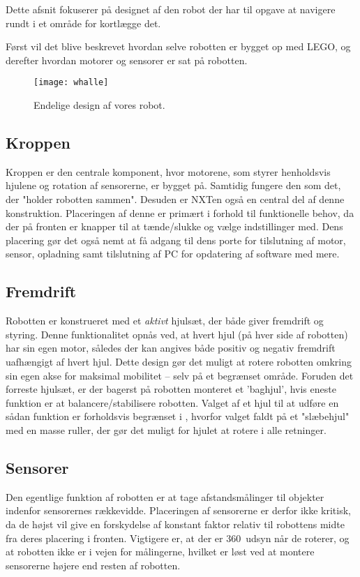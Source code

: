 Dette afsnit fokuserer på designet af den robot der har til opgave at navigere rundt i et område for kortlægge det. 

Først vil det blive beskrevet hvordan selve robotten er bygget op med LEGO, og derefter hvordan motorer og sensorer er sat på robotten.

\begin{figure}
\centering
\texttt{[image: whalle]}
\caption{Endelige design af vores robot.}
\label{robot:opbygning}
\end{figure}




\subsection{Kroppen}
Kroppen er den centrale komponent, hvor motorene, som styrer henholdsvis hjulene og rotation af sensorerne, er bygget på. 
Samtidig fungere den som det, der "holder robotten sammen".
Desuden er NXTen også en central del af denne konstruktion.
Placeringen af denne er primært i forhold til funktionelle behov, da der på fronten er knapper til at tænde/slukke og vælge indstillinger med.
Dens placering gør det også nemt at få adgang til dens porte for tilslutning af motor, sensor, opladning samt tilslutning af PC for opdatering af software med mere.

\subsection{Fremdrift}
Robotten er konstrueret med et \textit{aktivt} hjulsæt, der både giver fremdrift og styring.
Denne funktionalitet opnås ved, at hvert hjul (på hver side af robotten) har sin egen motor, således der kan angives både positiv og negativ fremdrift uafhængigt af hvert hjul.
Dette design gør det muligt at rotere robotten omkring sin egen akse for maksimal mobilitet -- selv på et begrænset område.
Foruden det forreste hjulsæt, er der bagerst på robotten monteret et 'baghjul', hvis eneste funktion er at balancere/stabilisere robotten.
Valget af et hjul til at udføre en sådan funktion er forholdsvis begrænset i \lego, hvorfor valget faldt på et "slæbehjul" med en masse ruller, der gør det muligt for hjulet at rotere i alle retninger.

\subsection{Sensorer}
Den egentlige funktion af robotten er at tage afstandsmålinger til objekter indenfor sensorernes rækkevidde.
Placeringen af sensorerne er derfor ikke kritisk, da de højst vil give en forskydelse af konstant faktor relativ til robottens midte fra deres placering i fronten.
Vigtigere er, at der er 360\degree~udsyn når de roterer, og at robotten ikke er i vejen for målingerne, hvilket er løst ved at montere sensorerne højere end resten af robotten. 

